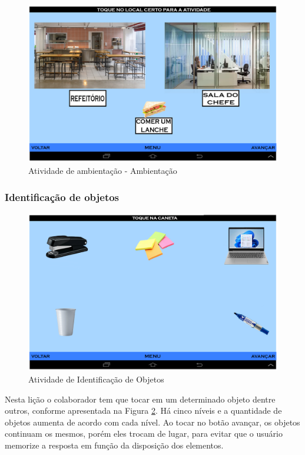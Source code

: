 \documentclass[12pt]{article}
\begin{document}
 \begin{figure}[h!]
    \centering
    \includegraphics[width=1.0\textwidth]{ambiente.png}
    \caption{Atividade de ambientação - Ambientação}
    \label{fig:ambiente}
\end{figure}
\subsubsection{Identificação de objetos}

 \begin{figure}[h!]
    \centering
    \includegraphics[width=1.0\textwidth]{identificacao_objetos.png}
    \caption{ Atividade de Identificação de Objetos}
    \label{fig:identificacao_objetos}
\end{figure}
Nesta lição o colaborador tem que tocar em um determinado objeto dentre outros, conforme apresentada na Figura \ref{fig:identificacao_objetos}. Há cinco níveis e a quantidade de objetos aumenta de
acordo com cada nível. Ao tocar no botão avançar, os objetos continuam os mesmos,
porém eles trocam de lugar, para evitar que o usuário memorize a resposta em função
da disposição dos elementos.
\end{document}
